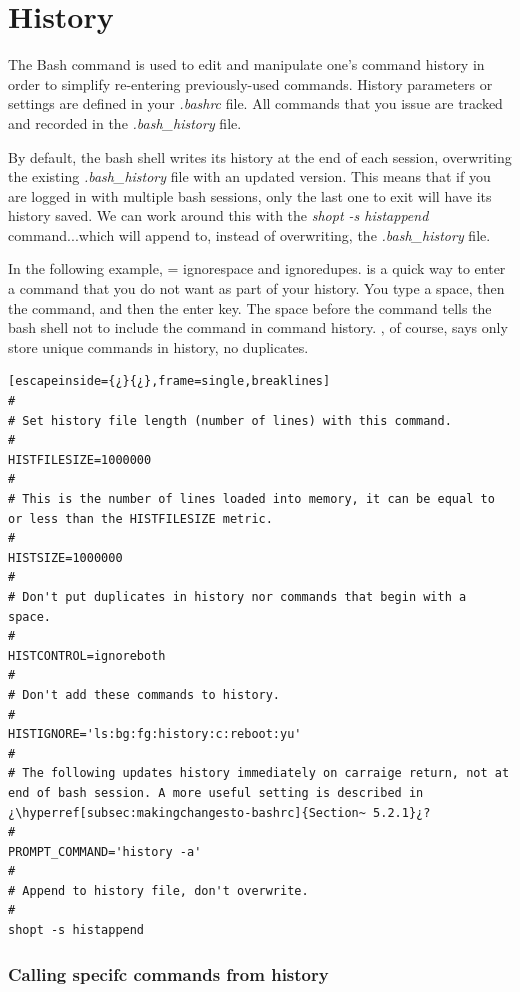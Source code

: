 \section{History}

 The Bash  command is used to edit and manipulate one's command history in order to simplify re-entering previously-used commands. History parameters or settings are defined in your \textsl{\ttb{}.bashrc} file. All commands that you issue are tracked and recorded in the \textsl{\ttb{}.bash\_history} file.
 
 By default, the bash shell writes its history at the end of each session, overwriting the existing \textsl{\ttb{}.bash\_history} file with an updated version. This means that if you are logged in with multiple bash sessions, only the last one to exit will have its history saved. We can work around this with the \emph{shopt -s histappend} command...which will append to, instead of overwriting, the \textsl{\ttb{}.bash\_history} file.
 
 In the following example,  = ignorespace and ignoredupes.  is a quick way to enter a command that you do not want as part of your history. You type a space, then the command, and then the enter key. The space before the command tells the bash shell not to include the command in command history. , of course, says only store unique commands in history, no duplicates.
 
\begin{lstlisting}[escapeinside={¿}{¿},frame=single,breaklines]
#
# Set history file length (number of lines) with this command.
#
HISTFILESIZE=1000000 
#
# This is the number of lines loaded into memory, it can be equal to or less than the HISTFILESIZE metric.
#
HISTSIZE=1000000
#
# Don't put duplicates in history nor commands that begin with a space.
#
HISTCONTROL=ignoreboth
#
# Don't add these commands to history.
#
HISTIGNORE='ls:bg:fg:history:c:reboot:yu'
#
# The following updates history immediately on carraige return, not at end of bash session. A more useful setting is described in ¿\hyperref[subsec:makingchangesto-bashrc]{Section~ 5.2.1}¿?
#
PROMPT_COMMAND='history -a'
#
# Append to history file, don't overwrite.
#
shopt -s histappend 
\end{lstlisting}

\subsubsection{Calling specifc commands from history}

